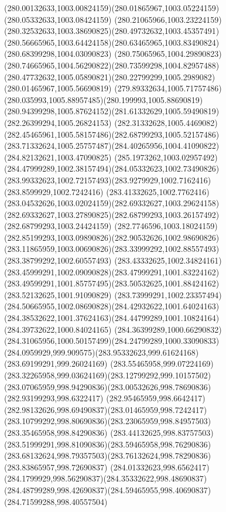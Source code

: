 {{\curveto(280.00132633,1003.00824159)(280.01865967,1003.05224159)(280.05332633,1003.08424159)
\curveto(280.21065966,1003.23224159)(280.32532633,1003.38690825)(280.49732632,1003.45357491)
\curveto(280.56665965,1003.64424158)(280.63465965,1003.83490824)(280.68399298,1004.03090823)
\curveto(280.75065965,1004.29890823)(280.74665965,1004.56290822)(280.73599298,1004.82957488)
\curveto(280.47732632,1005.05890821)(280.22799299,1005.2989082)(280.01465967,1005.56690819)
\curveto(279.89332634,1005.71757486)(280.035993,1005.88957485)(280.199993,1005.88690819)
\curveto(280.94399298,1005.87624152)(281.61332629,1005.59490819)(282.26399294,1005.26824153)
\curveto(282.31332628,1005.4469082)(282.45465961,1005.58157486)(282.68799293,1005.52157486)
\curveto(283.71332624,1005.25757487)(284.40265956,1004.41090822)(284.82132621,1003.47090825)
\curveto(285.1973262,1003.02957492)(284.47999289,1002.38157494)(284.05332623,1002.73490826)
\curveto(283.99332623,1002.72157493)(283.9279929,1002.7162416)(283.8599929,1002.7242416)
\curveto(283.41332625,1002.7762416)(283.04532626,1003.02024159)(282.69332627,1003.29624158)
\curveto(282.69332627,1003.27890825)(282.68799293,1003.26157492)(282.68799293,1003.24424159)
\curveto(282.7746596,1003.18024159)(282.85199293,1003.09890826)(282.90532626,1002.98690826)
\curveto(283.11865959,1003.00690826)(283.33999292,1002.88557493)(283.38799292,1002.60557493)
\curveto(283.43332625,1002.34824161)(283.45999291,1002.09090828)(283.47999291,1001.83224162)
\curveto(283.49599291,1001.85757495)(283.50532625,1001.88424162)(283.52132625,1001.91090829)
\curveto(283.73999291,1002.23357494)(284.50665955,1002.08690828)(284.42932622,1001.64024163)
\curveto(284.38532622,1001.37624163)(284.44799289,1001.10824164)(284.39732622,1000.84024165)
\curveto(284.36399289,1000.66290832)(284.31065956,1000.50157499)(284.24799289,1000.33090833)
\curveto(284.0959929,999.909575)(283.95332623,999.61624168)(283.69199291,999.26024169)
\curveto(283.55465958,999.07224169)(283.32265958,999.03624169)(283.12799292,999.10157502)
\curveto(283.07065959,998.94290836)(283.00532626,998.78690836)(282.93199293,998.6322417)
\curveto(282.95465959,998.6642417)(282.98132626,998.69490837)(283.01465959,998.7242417)
\curveto(283.10799292,998.80690836)(283.23065959,998.84957503)(283.35465958,998.84290836)
\curveto(283.44132625,998.83757503)(283.51999291,998.81090836)(283.59465958,998.76290836)
\curveto(283.68132624,998.79357503)(283.76132624,998.78290836)(283.83865957,998.72690837)
\curveto(284.01332623,998.6562417)(284.1799929,998.56290837)(284.35332622,998.48690837)
\curveto(284.48799289,998.42690837)(284.59465955,998.40690837)(284.71599288,998.40557504)
}}
